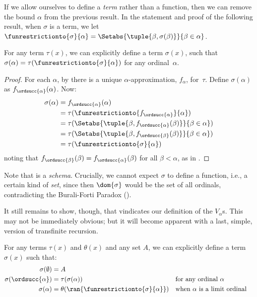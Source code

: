 \documentclass[../../../include/open-logic-section]{subfiles}
\begin{document}
If we allow ourselves to define a \emph{term} rather than a function,
then we can remove the bound $\alpha$ from the previous result. In
the statement and proof of the following result, when $\sigma$ is a term, we
let $\funrestrictionto{\sigma}{\alpha} = \Setabs{\tuple{\beta,
\sigma(\beta)}}{\beta \in \alpha}$.

\begin{thm}
For any term $\tau(x)$, we can explicitly define a term
$\sigma(x)$, such that
$\sigma(\alpha) = \tau(\funrestrictionto{\sigma}{\alpha})$ for any
ordinal~$\alpha$.
\end{thm}

\begin{proof}
For each $\alpha$, by  there is a unique $\alpha$-approximation, $f_\alpha$, for~$\tau$. Define $\sigma(\alpha)$ as $f_{\ordsucc{\alpha}}(\alpha)$. Now:
	\begin{align*}
		\sigma(\alpha) &= 
		f_{\ordsucc{\alpha}}(\alpha) \\&= 
		\tau(\funrestrictionto{f_{\ordsucc{\alpha}}}{\alpha}) \\&= 
		\tau(\Setabs{\tuple{\beta, f_{\ordsucc{\alpha}}(\beta)}}{\beta \in \alpha}) \\&= 
		\tau(\Setabs{\tuple{\beta, f_{\ordsucc{\beta}}(\beta)}}{\beta \in \alpha})\\&=
		\tau(\funrestrictionto{\sigma}{\alpha})
	\end{align*}
noting that $f_{\ordsucc{\beta}}(\beta) = f_{\ordsucc{\alpha}}(\beta)$ for all $\beta < \alpha$, as in . 
\end{proof}
\noindent 
Note that  is a \emph{schema}. Crucially, we cannot
expect $\sigma$ to define a function, i.e., a certain kind of
\emph{set}, since then $\dom{\sigma}$ would be the set of all
ordinals, contradicting the Burali-Forti Paradox
().

It still remains to show, though, that 
vindicates our definition of the $V_\alpha$s. This may not be
immediately obvious; but it will become apparent with a last, simple,
version of transfinite recursion.

\begin{thm} 
For any terms $\tau(x)$ and $\theta(x)$ and any set $A$, we can
explicitly define a term $\sigma(x)$ such that:
\begin{align*}
	\sigma(\emptyset) &= A\\
	\sigma(\ordsucc{\alpha}) &= \tau(\sigma(\alpha)) &&
		\text{for any ordinal }\alpha\\
	\sigma(\alpha) &= \theta(\ran{\funrestrictionto{\sigma}{\alpha}})&&
	\text{when }\alpha\text{ is a limit ordinal}
\end{align*}
\end{thm}
\end{document}

